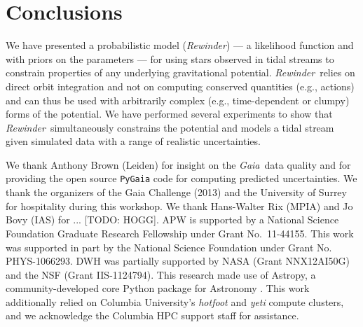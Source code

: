 \documentclass[letterpaper,12pt,preprint]{aastex}
\newcommand{\project}[1]{\textsl{#1}}
\newcommand{\gaia}{\project{Gaia}}
\newcommand{\rewinder}{\emph{Rewinder}}
\begin{document}

\section{Conclusions}
We have presented a probabilistic model (\rewinder) --- a likelihood function and with priors on the parameters --- for using stars observed in tidal streams to constrain properties of any underlying gravitational potential. \rewinder\, relies on direct orbit integration and not on computing conserved quantities (e.g., actions) and can thus be used with arbitrarily complex (e.g., time-dependent or clumpy) forms of the potential. We have performed several experiments to show that \rewinder\, simultaneously constrains the potential and models a tidal stream given simulated data with a range of realistic uncertainties. 

\acknowledgements
We thank Anthony Brown (Leiden) for insight on the \gaia\, data quality and for providing the open source \texttt{PyGaia} code for computing predicted uncertainties. We thank the organizers of the Gaia Challenge (2013) and the University of Surrey for hospitality during this workshop. We thank Hans-Walter Rix (MPIA) and Jo Bovy (IAS) for ... [TODO: HOGG].
APW is supported by a National Science Foundation Graduate Research Fellowship under Grant No.\ 11-44155. This work was supported in part by the National Science Foundation under Grant No. PHYS-1066293. 
DWH was partially supported by NASA (Grant NNX12AI50G) and the NSF (Grant IIS-1124794).
This research made use of Astropy, a community-developed core Python package for Astronomy \citep{astropy13}.
This work additionally relied on Columbia University's \emph{hotfoot} and \emph{yeti} compute clusters, and we acknowledge the Columbia HPC support staff for assistance. \\



\end{document}
